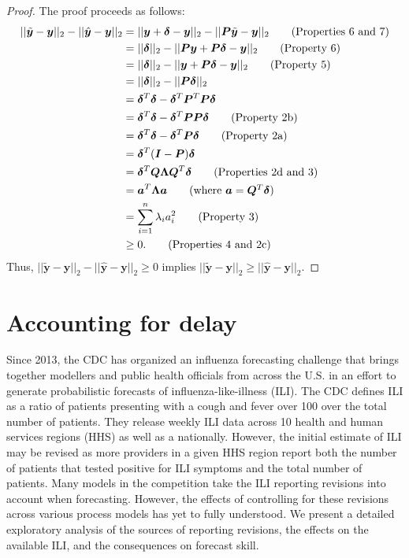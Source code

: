 \documentclass{umassthesis}          %
\begin{document}
\begin{proof}
The proof proceeds as follows:
\begin{align*}
||\tilde{\bm{y}} - \bm{y}||_2 - ||\hat{\bm{y}} - \bm{y}||_2 &= ||\bm{y} + \bm{\delta} - \bm{y}||_2 - ||\boldsymbol{P}\tilde{\bm{y}} - \bm{y}||_2 \tag*{(Properties 6 and 7)}\\
&= ||\bm{\delta}||_2 - ||\boldsymbol{P}\bm{y} + \boldsymbol{P}\bm{\delta} - \bm{y}||_2 \tag*{(Property 6)} \\
&= ||\bm{\delta}||_2 - ||\bm{y}  + \boldsymbol{P}\bm{\delta} - \bm{y}||_2 \tag*{(Property 5)}\\
&= ||\bm{\delta}||_2 - ||\boldsymbol{P}\bm{\delta}||_2 \\
&= \bm{\delta}^T\bm{\delta} - \bm{\delta}^T\boldsymbol{P}^T \boldsymbol{P} \bm{\delta} \\
&= \bm{\delta}^T\bm{\delta} - \bm{\delta}^T\boldsymbol{P} \boldsymbol{P} \bm{\delta} \tag*{(Property 2b)}\\
&= \bm{\delta}^T\bm{\delta} - \bm{\delta}^T\boldsymbol{P} \bm{\delta} \tag*{(Property 2a)}\\
&= \bm{\delta}^T ( \boldsymbol{I} - \boldsymbol{P}) \bm{\delta} \\
&= \bm{\delta}^T \boldsymbol{Q} \boldsymbol{\Lambda} \boldsymbol{Q}^T \bm{\delta} \tag*{(Properties 2d and 3)}\\
&= \bm{a}^T \boldsymbol{\Lambda} \bm{a} \tag*{(where $\bm{a} = \boldsymbol{Q}^T \bm{\delta}$)}\\
&= \sum_{i=1}^n \lambda_i a_i^2 \tag*{(Property 3)}\\
&\geq 0. \tag*{(Properties 4 and 2c)}
\end{align*}
\noindent Thus, $||\tilde{\bm{y}} - \bm{y}||_2 - ||\hat{\bm{y}} - \bm{y}||_2 \geq 0$ implies $||\tilde{\bm{y}} - \bm{y}||_2 \geq ||\hat{\bm{y}} - \bm{y}||_2$.
\end{proof}

\chapter{Accounting for delay}

 Since 2013, the CDC has organized an influenza forecasting challenge that brings together modellers and public health officials from across the U.S. in an effort to generate probabilistic forecasts of influenza-like-illness (ILI). The CDC defines ILI as a ratio of patients presenting with a cough and fever over 100 over the total number of patients. They release weekly ILI data across 10 health and human services regions (HHS) as well as a nationally. However, the initial estimate of ILI may be revised as more providers in a given HHS region report both the number of patients that tested positive for ILI symptoms and the total number of patients. Many models in the competition take the ILI reporting revisions into account when forecasting. However, the effects of controlling for these revisions across various process models has yet to fully understood. We present a detailed exploratory analysis of the sources of reporting revisions, the effects on the available ILI, and the consequences on forecast skill. 
\end{document}

